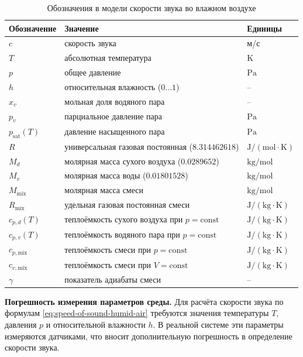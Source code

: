 \documentclass[a4paper,11pt]{article} %
\begin{document}
\begin{table}[!htbp]
  \centering
  \caption{Обозначения в модели скорости звука во влажном воздухе}
  \label{tab:speed-of-sound-notation}
  \small
  \begin{tabular}{lll}
    \toprule
    Обозначение & Значение & Единицы \\
    \midrule
    $c$ & скорость звука & м/с \\
    $T$ & абсолютная температура & $\mathrm{K}$ \\
    $p$ & общее давление & $\mathrm{Pa}$ \\
    $h$ & относительная влажность ($0\ldots 1$) & -- \\
    $x_v$ & мольная доля водяного пара & -- \\
    $p_v$ & парциальное давление пара & $\mathrm{Pa}$ \\
    $p_{\mathrm{sat}}(T)$ & давление насыщенного пара & $\mathrm{Pa}$ \\
    $R$ & универсальная газовая постоянная ($8.314462618$) & $\mathrm{J/(mol\cdot K)}$ \\
    $M_d$ & молярная масса сухого воздуха ($0.0289652$) & $\mathrm{kg/mol}$ \\
    $M_v$ & молярная масса воды ($0.01801528$) & $\mathrm{kg/mol}$ \\
    $M_{\mathrm{mix}}$ & молярная масса смеси & $\mathrm{kg/mol}$ \\
    $R_{\mathrm{mix}}$ & удельная газовая постоянная смеси & $\mathrm{J/(kg\cdot K)}$ \\
    $c_{p,d}(T)$ & теплоёмкость сухого воздуха при $p=\mathrm{const}$ & $\mathrm{J/(kg\cdot K)}$ \\
    $c_{p,v}(T)$ & теплоёмкость водяного пара при $p=\mathrm{const}$ & $\mathrm{J/(kg\cdot K)}$ \\
    $c_{p,\mathrm{mix}}$ & теплоёмкость смеси при $p=\mathrm{const}$ & $\mathrm{J/(kg\cdot K)}$ \\
    $c_{v,\mathrm{mix}}$ & теплоёмкость смеси при $V=\mathrm{const}$ & $\mathrm{J/(kg\cdot K)}$ \\
    $\gamma$ & показатель адиабаты смеси & -- \\
    \bottomrule
  \end{tabular}
\end{table}
\FloatBarrier

\textbf{Погрешность измерения параметров среды.}
Для расчёта скорости звука по формулам \eqref{eq:speed-of-sound-humid-air} требуются значения температуры $T$, давления $p$ и относительной влажности $h$. В реальной системе эти параметры измеряются датчиками, что вносит дополнительную погрешность в определение скорости звука.
\end{document}
